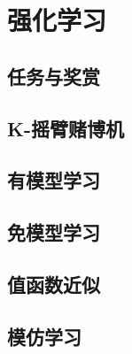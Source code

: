 \newpage
\section{强化学习}
\subsection{任务与奖赏}
\subsection{K-摇臂赌博机}
\subsection{有模型学习}
\subsection{免模型学习}
\subsection{值函数近似}
\subsection{模仿学习}